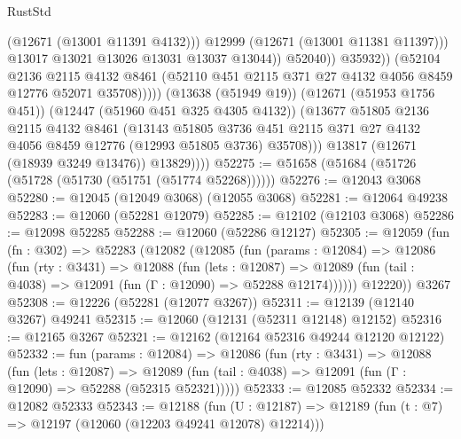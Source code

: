 \begin{lexlean}{RustStd}
\begin{coremodule}
                                    (@12671 (@13001 @11391 @4132)))
                                  @12999
                                  (@12671 (@13001 @11381 @11397)))
                                @13017
                                @13021
                                @13026
                                @13031
                                @13037
                                @13044))
                            @52040))
                        @35932))
                    (@52104
                      @2136
                      @2115
                      @4132
                      @8461
                      (@52110 @451 @2115 @371 @27 @4132 @4056 @8459 @12776 @52071 @35708)))))
              (@13638 (@51949 @19))
              (@12671 (@51953 @1756 @451))
              (@12447 (@51960 @451 @325 @4305 @4132))
              (@13677
                @51805
                @2136
                @2115
                @4132
                @8461
                (@13143
                  @51805
                  @3736
                  @451
                  @2115
                  @371
                  @27
                  @4132
                  @4056
                  @8459
                  @12776
                  (@12993 @51805 @3736)
                  @35708)))
            @13817
            (@12671 (@18939 @3249 @13476))
            @13829))))
@52275 := @51658 (@51684 (@51726 (@51728 (@51730 (@51751 (@51774 @52268))))))
@52276 := @12043 @3068
@52280 := @12045 (@12049 @3068) (@12055 @3068)
@52281 := @12064 @49238
@52283 := @12060 (@52281 @12079)
@52285 := @12102 (@12103 @3068)
@52286 := @12098 @52285
@52288 := @12060 (@52286 @12127)
@52305 := @12059
    (fun (fn : @302) =>
    @52283
      (@12082
        (@12085
          (fun (params : @12084) =>
          @12086
            (fun (rty : @3431) =>
            @12088
              (fun (lets : @12087) =>
              @12089 (fun (tail : @4038) => @12091 (fun (Γ : @12090) => @52288 @12174))))))
        @12220))
    @3267
@52308 := @12226 (@52281 (@12077 @3267))
@52311 := @12139 (@12140 @3267) @49241
@52315 := @12060 (@12131 (@52311 @12148) @12152)
@52316 := @12165 @3267
@52321 := @12162 (@12164 @52316 @49244 @12120 @12122)
@52332 := fun (params : @12084) =>
  @12086
    (fun (rty : @3431) =>
    @12088
      (fun (lets : @12087) =>
      @12089 (fun (tail : @4038) => @12091 (fun (Γ : @12090) => @52288 (@52315 @52321)))))
@52333 := @12085 @52332
@52334 := @12082 @52333
@52343 := @12188
    (fun (U : @12187) => @12189 (fun (t : @7) => @12197 (@12060 (@12203 @49241 @12078) @12214)))

\end{coremodule}
\end{lexlean}
